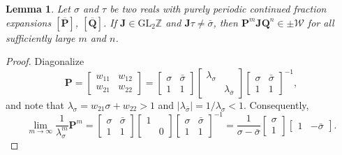 \documentclass{article}
\numberwithin{equation}{section}
\newtheorem{lem}[thm]{Lemma}
\theoremstyle{definition}
\theoremstyle{remark}
\newcommand{\GL}{\mathrm{GL}}
\newcommand{\ZZ}{\mathbb{Z}}
\newcommand{\W}{\mathcal{W}}
\renewcommand{\to}{\mathop{\rightarrow}\limits}
\newcommand{\<}{\left\langle}
\renewcommand{\>}{\right\rangle}
\begin{document}
\begin{lem} Let $\sigma$ and $\tau$ be two reals with purely periodic continued fraction expansions $[\overline{\mathbf{P}}]$, $[\overline{\mathbf{Q}}]$. If $\mathbf{J} \in \GL_2 \ZZ$ and $\mathbf{J}\tau \neq \bar\sigma$, then $\mathbf{P}^m \mathbf{J} \mathbf{Q}^n \in \pm\W$ for all sufficiently large $m$ and $n$.
\end{lem}
\begin{proof}
  Diagonalize
  \begin{equation*}
    \mathbf{P} = \begin{bmatrix}
      w_{11} & w_{12} \\
      w_{21} & w_{22}
    \end{bmatrix}
    =
    \begin{bmatrix}
      \sigma & \bar\sigma \\
      1 & 1
    \end{bmatrix}
    \begin{bmatrix}
      \lambda_\sigma &  \\
      & \lambda_{\bar\sigma}
    \end{bmatrix}
    \begin{bmatrix}
      \sigma & \bar\sigma \\
      1 & 1
    \end{bmatrix}^{-1},
  \end{equation*}
  and note that $\lambda_\sigma = w_{21} \sigma + w_{22} > 1$ and $|\lambda_{\bar\sigma}| = 1/\lambda_\sigma < 1$. Consequently,
  \begin{equation}
    \lim_{m \to \infty} \frac{1}{\lambda_\sigma^m} \mathbf{P}^m =  \begin{bmatrix}
      \sigma & \bar\sigma \\
      1 & 1
    \end{bmatrix}
    \begin{bmatrix}
      1 &   \\
      & 0
    \end{bmatrix}
    \begin{bmatrix}
      \sigma & \bar\sigma \\
      1 & 1
    \end{bmatrix}^{-1}
    = \frac{1}{\sigma - \bar\sigma} \begin{bmatrix}
      \sigma \\ 1
    \end{bmatrix} \begin{bmatrix}
      1 & -\bar\sigma
    \end{bmatrix}.

\end{equation}
\end{proof}
\end{document}
